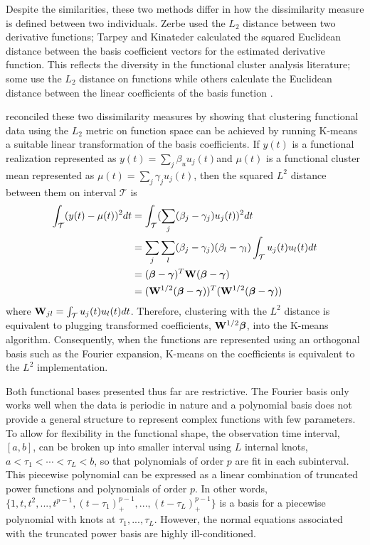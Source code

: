 Despite the similarities, these two methods differ in how the dissimilarity measure is defined between two individuals. Zerbe used the $L_{2}$ distance between two derivative functions; Tarpey and Kinateder calculated the squared Euclidean distance between the basis coefficient vectors for the estimated derivative function. This reflects the diversity in the functional cluster analysis literature; some use the $L_{2}$ distance on functions \cite{hitchcock2007} while others calculate the Euclidean distance between the linear coefficients of the basis function \cite{abraham2003,serban2005, tarpey2003}.
 
\textcite{tarpey2007} reconciled these two dissimilarity measures by showing that clustering functional data using the $L_{2}$ metric on function space can be achieved by running K-means a suitable linear transformation of the basis coefficients. If $y(t)$ is a functional realization represented as $y(t)=\sum_{j}\beta_{u}u_{j}(t)$and $\mu(t)$ is a functional cluster mean represented as $\mu(t) = \sum_{j}\gamma_{j}u_{j}(t)$, then the squared $L^{2}$ distance between them on interval $\mathcal{T}$ is
\begin{align*}
\int_{\mathcal{T}}(y(t)-\mu(t))^{2}dt &= \int_{\mathcal{T}}(\sum_{j}(\beta_{j}-\gamma_{j})u_{j}(t))^{2}dt\\
&= \sum_{j}\sum_{l}(\beta_{j}-\gamma_{j})(\beta_{l}-\gamma_{l}) \int_{\mathcal{T}}u_{j}(t)u_{l}(t)dt\\
&=(\boldsymbol\beta-\boldsymbol\gamma)^{T}\mathbf W (\boldsymbol\beta-\boldsymbol\gamma)\\
&=(\mathbf W^{1/2}(\boldsymbol\beta-\boldsymbol\gamma))^{T} (\mathbf W^{1/2}(\boldsymbol\beta-\boldsymbol\gamma))
\end{align*}
where $\mathbf W_{jl} = \int_{\mathcal{T}}u_{j}(t)u_{l}(t)dt$. Therefore, clustering with the $L^{2}$ distance is equivalent to plugging transformed coefficients, $\mathbf W^{1/2}\boldsymbol\beta$, into the K-means algorithm. Consequently, when the functions are represented using an orthogonal basis such as the Fourier expansion, K-means on the coefficients is equivalent to the $L^{2}$ implementation.

Both functional bases presented thus far are restrictive. The Fourier basis only works well when the data is periodic in nature and a polynomial basis does not provide a general structure to represent complex functions with few parameters. 
To allow for flexibility in the functional shape, the observation time interval, $[a,b]$, can be broken up into smaller interval using $L$ internal knots, $a<\tau_{1}<\cdots<\tau_{L}<b$, so that polynomials of order $p$ are fit in each subinterval. This piecewise polynomial can be expressed as a linear combination of truncated power functions and polynomials of order $p$. In other words,
$\{1,t,t^{2},...,t^{p-1},(t-\tau_{1})_{+}^{p-1},...,(t-\tau_{L})_{+}^{p-1}\}$
is a basis for a piecewise polynomial with knots at $\tau_{1},...,\tau_{L}$. However, the normal equations associated with the truncated power basis are highly ill-conditioned. 

